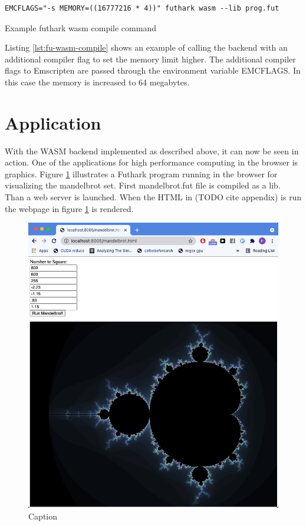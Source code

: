 \documentclass[11pt]{book}
\begin{document}
\begin{listing}
\begin{verbatim}
EMCFLAGS="-s MEMORY=((16777216 * 4))" futhark wasm --lib prog.fut
\end{verbatim}
\caption{Example futhark wasm compile command}
\label{lst:fu-wasm-compile}
\end{listing}

Listing \ref{lst:fu-wasm-compile} shows an example of calling the backend with an additional compiler flag to set the memory limit higher. The additional compiler flags to Emscripten are passed through the environment variable EMCFLAGS. In this case the memory is increased to 64 megabytes.
\section{Application}

With the WASM backend implemented as described above, it can now be seen in action. One of the applications for high performance computing in the browser is graphics. Figure \ref{fig:mandelbrot} illustrates a Futhark program running in the browser for visualizing the mandelbrot set. First mandelbrot.fut file is compiled as a lib. Than a web server is launched. When the HTML in (TODO cite appendix) is run the webpage in figure \ref{fig:mandelbrot} is rendered.



\begin{figure}[htbp]
    \centering
    \includegraphics[scale=0.3]{figures/mandelbrot.png}
    \caption{Caption}
    \label{fig:mandelbrot}
\end{figure}
\end{document}
